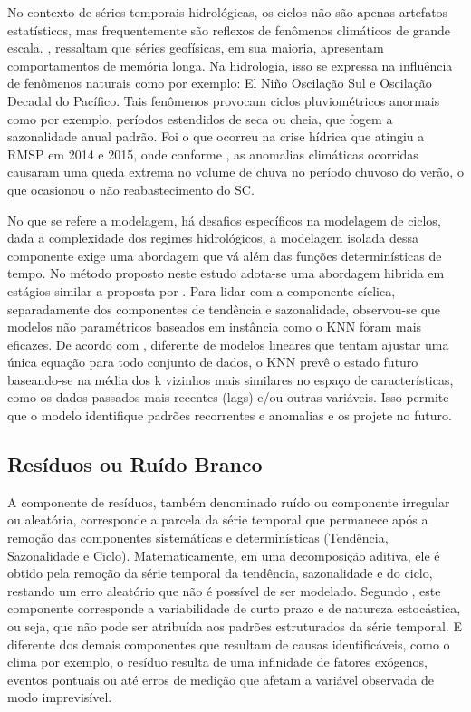 No contexto de séries temporais hidrológicas, os ciclos não são apenas artefatos estatísticos, mas frequentemente são reflexos de fenômenos climáticos de grande escala. \textcite{Morettin_Toloi}, ressaltam que séries geofísicas, em sua maioria, apresentam comportamentos de memória longa. Na hidrologia, isso se expressa na influência de fenômenos naturais como por exemplo: El Niño Oscilação Sul e Oscilação Decadal do Pacífico. Tais fenômenos provocam ciclos pluviométricos anormais como por exemplo, períodos estendidos de seca ou cheia, que fogem a sazonalidade anual padrão. Foi o que ocorreu na crise hídrica que atingiu a \acrshort{RMSP} em 2014 e 2015, onde conforme \textcite{Marengo}, as anomalias climáticas ocorridas causaram uma queda extrema no volume de chuva no período chuvoso do verão, o que ocasionou o não reabastecimento do \acrfull{SC}.  

No que se refere a modelagem, há desafios específicos na modelagem de ciclos, dada a complexidade dos regimes hidrológicos, a modelagem isolada dessa componente exige uma abordagem que vá além das funções determinísticas de tempo. No método proposto neste estudo adota-se uma abordagem hibrida em estágios similar a proposta por \cite{Zhang}. Para lidar com a componente cíclica, separadamente dos componentes de tendência e sazonalidade, observou-se que modelos não paramétricos baseados em instância como o \acrfull{KNN} foram mais eficazes. De acordo com \textcite{Hastie_Tibshirani_Friedman}, diferente de modelos lineares que tentam ajustar uma única equação para todo conjunto de dados, o KNN prevê o estado futuro baseando-se na média dos k vizinhos mais similares no espaço de características, como os dados passados mais recentes (lags) e/ou outras variáveis. Isso permite que o modelo identifique padrões recorrentes e anomalias e os projete no futuro.  

\subsection{Resíduos ou Ruído Branco}

A componente de resíduos, também denominado ruído ou componente irregular ou aleatória, corresponde a parcela da série temporal que permanece após a remoção das componentes sistemáticas e determinísticas (Tendência, Sazonalidade e Ciclo). Matematicamente, em uma decomposição aditiva, ele é obtido pela remoção da série temporal da tendência, sazonalidade e do ciclo, restando um erro aleatório que não é possível de ser modelado. Segundo \textcite{Hyndman_Athanassopoulos}, este componente corresponde a variabilidade de curto prazo e de natureza estocástica, ou seja, que não pode ser atribuída aos padrões estruturados da série temporal. E diferente dos demais componentes que resultam de causas identificáveis, como o clima por exemplo, o resíduo resulta de uma infinidade de fatores exógenos, eventos pontuais ou até erros de medição que afetam a variável observada de modo imprevisível.  

